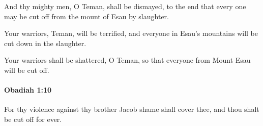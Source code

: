 			\begin{versebox}
					\item[BHS] 
					\item[LXX] 
					\item[ASV] And thy mighty men, O Teman, shall be dismayed, to the end that every one may be cut off from the mount of Esau by slaughter.
					\item[NIV] Your warriors, Teman, will be terrified, and everyone in Esau’s mountains will be cut down in the slaughter.
					\item[NRSV] Your warriors shall be shattered, O Teman, so that everyone from Mount Esau will be cut off.
			\end{versebox}

		\paragraph{Obadiah 1:10} %
			\label{OBADIAH-1-10}

			For thy violence against thy brother Jacob shame shall cover thee, and thou shalt be cut off for ever.

